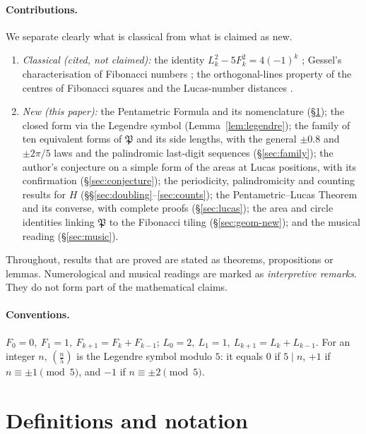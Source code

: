 \documentclass[11pt,a4paper]{article}
\newcommand{\Pent}{\mathfrak{P}}                      %
\newcommand{\leg}[1]{\left(\tfrac{#1}{5}\right)}      %
\theoremstyle{plain}
\theoremstyle{definition}
\theoremstyle{remark}
\begin{document}
\paragraph{Contributions.} We separate clearly what is classical from what is claimed as new.
\begin{enumerate}[label=(\roman*),itemsep=2pt]
  \item \emph{Classical (cited, not claimed):} the identity $L_k^{2}-5F_k^{2}=4(-1)^{k}$ \cite{Koshy2001}; Gessel's characterisation of Fibonacci numbers \cite{Gessel1971}; the orthogonal-lines property of the centres of Fibonacci squares and the Lucas-number distances \cite{Holden1975,HoggattAlladi1975,Gardiner1984}.
  \item \emph{New (this paper):} the Pentametric Formula and its nomenclature (§\ref{sec:defs}); the closed form via the Legendre symbol (Lemma~\ref{lem:legendre}); the family of ten equivalent forms of $\Pent$ and its side lengths, with the general $\pm0.8$ and $\pm2\pi/5$ laws and the palindromic last-digit sequences (§\ref{sec:family}); the author's conjecture on a simple form of the areas at Lucas positions, with its confirmation (§\ref{sec:conjecture}); the periodicity, palindromicity and counting results for $H$ (§§\ref{sec:doubling}–\ref{sec:counts}); the Pentametric–Lucas Theorem and its converse, with complete proofs (§\ref{sec:lucas}); the area and circle identities linking $\Pent$ to the Fibonacci tiling (§\ref{sec:geom-new}); and the musical reading (§\ref{sec:music}).
\end{enumerate}
Throughout, results that are proved are stated as theorems, propositions or lemmas. Numerological and musical readings are marked as \emph{interpretive remarks}. They do not form part of the mathematical claims.

\paragraph{Conventions.} $F_0=0,\ F_1=1,\ F_{k+1}=F_k+F_{k-1}$; $L_0=2,\ L_1=1,\ L_{k+1}=L_k+L_{k-1}$. For an integer $n$, $\leg{n}$ is the Legendre symbol modulo $5$: it equals $0$ if $5\mid n$, $+1$ if $n\equiv\pm1\pmod 5$, and $-1$ if $n\equiv\pm2\pmod 5$.

\section{Definitions and notation}\label{sec:defs}
\end{document}
